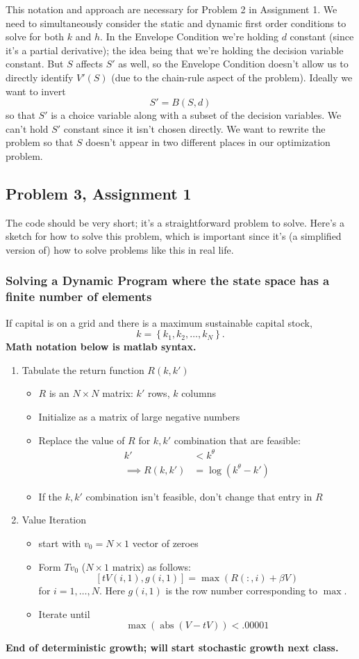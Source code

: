 \documentclass[11pt]{article}
\begin{document}
This notation and approach are necessary for Problem 2 in Assignment 1. We need to simultaneously consider the static and dynamic first order conditions to solve for both \(k\) and \(h\). In the Envelope Condition we're holding \(d\) constant (since it's a partial derivative); the idea being that we're holding the decision variable constant. But \(S\) affects \(S'\) as well, so the Envelope Condition doesn't allow us to directly identify \(V'(S)\) (due to the chain-rule aspect of the problem). Ideally we want to invert
\[
S' = B(S, d)
\]
so that \(S'\) is a choice variable along with a subset of the decision variables. We can't hold \(S'\) constant since it isn't chosen directly. We want to rewrite the problem so that \(S\) doesn't appear in two different places in our optimization problem.

\subsection{Problem 3, Assignment 1}
\label{sec:orgbc63df7}
The code should be very short; it's a straightforward problem to solve. Here's a sketch for how to solve this problem, which is important since it's (a simplified version of) how to solve problems like this in real life. 

\subsubsection{Solving a Dynamic Program where the state space has a finite number of elements}
\label{sec:orgbb09223}
If capital is on a grid and there is a maximum sustainable capital stock, 
\[
k = \left\{k_1, k_2, \ldots, k_N\right\}.
\]
\textbf{Math notation below is matlab syntax.}
\begin{enumerate}
\item Tabulate the return function $R(k, k')$
\begin{itemize}
\item $R$ is an $N \times N$ matrix: $k'$ rows, $k$ columns
\item Initialize as a matrix of large negative numbers
\item Replace the value of $R$ for $k, k'$ combination that are feasible:
\begin{align*}
k' &< k^\theta \tag{$c$ positive}\\
\implies R(k, k') &= \log(k^\theta - k')
\end{align*}
\item If the $k, k'$ combination isn't feasible, don't change that entry in $R$
\end{itemize}
\item Value Iteration
\begin{itemize}
\item start with $v_0 = N \times 1$ vector of zeroes
\item Form $Tv_0$ ($N \times 1$ matrix) as follows:
\[
[tV(i, 1), g(i, 1)] = \max (R(:, i) + \beta V)
\]
for $i = 1, \ldots, N$. Here $g(i, 1)$ is the row number corresponding to $\max$.
\item Iterate until
\[
\max(\operatorname{abs}(V - tV)) < .00001
\]
\end{itemize}
\end{enumerate}

\noindent \textbf{End of deterministic growth; will start stochastic growth next class.}
\end{document}
